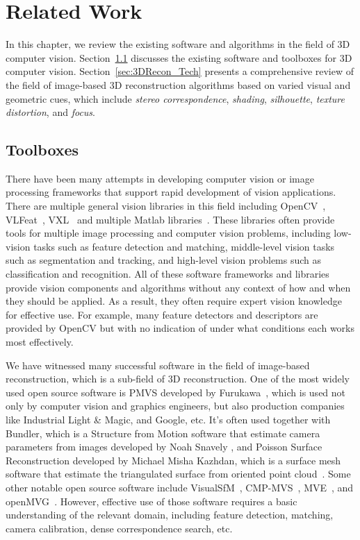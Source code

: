 
\chapter{Related Work}
\label{ch:RelatedWork}
In this chapter, we review the existing software and algorithms in the field of 3D computer vision. Section~\ref{sec:Toolbox} discusses the existing software and toolboxes for 3D computer vision. Section~\ref{sec:3DRecon_Tech} presents a comprehensive review of the field of image-based 3D reconstruction algorithms based on varied visual and geometric cues, which include \textit{stereo correspondence}, \textit{shading}, \textit{silhouette}, \textit{texture distortion}, and \textit{focus}.

\section{Toolboxes}
\label{sec:Toolbox}
There have been many attempts in developing computer vision or image processing frameworks that support rapid development of vision applications. There are multiple general vision libraries in this field including OpenCV~\cite{bradski2008learning}, VLFeat~\cite{vedaldi08vlfeat}, VXL~\cite{vxl17} and multiple Matlab libraries~\cite{KovesiMATLABCode, MariottiniPr_RAM05}. These libraries often provide tools for multiple image processing and computer vision problems, including low-vision tasks such as feature detection and matching, middle-level vision tasks such as segmentation and tracking, and high-level vision problems such as classification and recognition. All of these software frameworks and libraries provide vision components and algorithms without any context of how and when they should be applied. As a result, they often require expert vision knowledge for effective use. For example, many feature detectors and descriptors are provided by OpenCV but with no indication of under what conditions each works most effectively.

We have witnessed many successful software in the field of image-based reconstruction, which is a sub-field of 3D reconstruction. One of the most widely used open source software is PMVS developed by Furukawa~\cite{furukawa2010accurate}, which is used not only by computer vision and graphics engineers, but also production companies like Industrial Light \& Magic, and Google, etc. It's often used together with Bundler, which is a Structure from Motion software that estimate camera parameters from images developed by Noah Snavely \cite{snavely2006photo}, and Poisson Surface Reconstruction developed by Michael Misha Kazhdan, which is a surface mesh software that estimate the triangulated surface from oriented point cloud~\cite{kazhdan2006poisson}. Some other notable open source software include VisualSfM~\cite{wu2011visualsfm}, CMP-MVS~\cite{Heller-etal-MVA-2015}, MVE~\cite{fuhrmann2014mve}, and openMVG~\cite{openMVG}. However, effective use of those software requires a basic understanding of the relevant domain, including feature detection, matching, camera calibration, dense correspondence search, etc.

